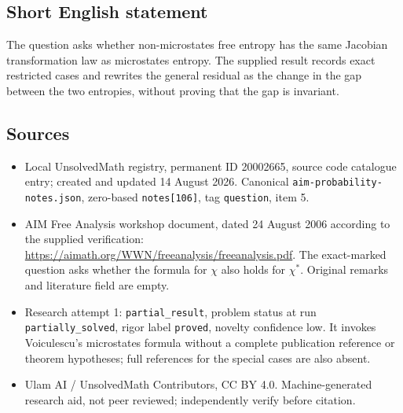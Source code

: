 \documentclass[11pt]{article}
\begin{document}
\subsection{Short English statement}
The question asks whether non-microstates free entropy has the same Jacobian transformation law as microstates entropy. The supplied result records exact restricted cases and rewrites the general residual as the change in the gap between the two entropies, without proving that the gap is invariant.
\subsection{Sources}
\begin{itemize}
\item Local UnsolvedMath registry, permanent ID 20002665, source code catalogue entry; created and updated 14 August 2026. Canonical \texttt{aim-probability-notes.json}, zero-based \texttt{notes[106]}, tag \texttt{question}, item 5.
\item AIM Free Analysis workshop document, dated 24 August 2006 according to the supplied verification: \url{https://aimath.org/WWN/freeanalysis/freeanalysis.pdf}. The exact-marked question asks whether the formula for $\chi$ also holds for $\chi^*$. Original remarks and literature field are empty.
\item Research attempt 1: \texttt{partial\_result}, problem status at run \texttt{partially\_solved}, rigor label \texttt{proved}, novelty confidence low. It invokes Voiculescu's microstates formula without a complete publication reference or theorem hypotheses; full references for the special cases are also absent.
\item Ulam AI / UnsolvedMath Contributors, CC BY 4.0. Machine-generated research aid, not peer reviewed; independently verify before citation.
\end{itemize}
\end{document}

